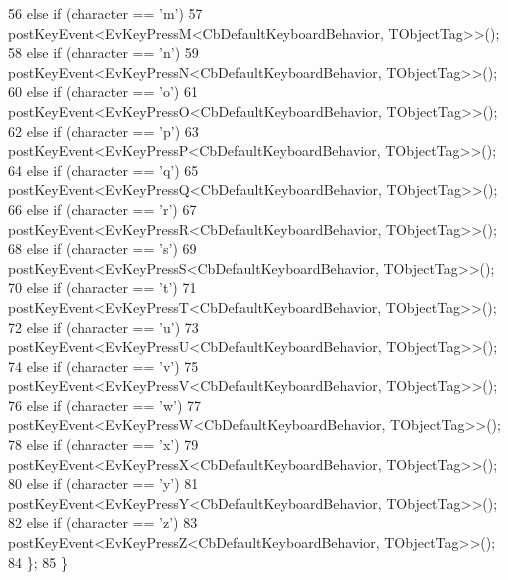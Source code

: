 \begin{DoxyCode}
56             \textcolor{keywordflow}{else} \textcolor{keywordflow}{if} (character == \textcolor{charliteral}{'m'})
57                 postKeyEvent<EvKeyPressM<CbDefaultKeyboardBehavior, TObjectTag>>();
58             \textcolor{keywordflow}{else} \textcolor{keywordflow}{if} (character == \textcolor{charliteral}{'n'})
59                 postKeyEvent<EvKeyPressN<CbDefaultKeyboardBehavior, TObjectTag>>();
60             \textcolor{keywordflow}{else} \textcolor{keywordflow}{if} (character == \textcolor{charliteral}{'o'})
61                 postKeyEvent<EvKeyPressO<CbDefaultKeyboardBehavior, TObjectTag>>();
62             \textcolor{keywordflow}{else} \textcolor{keywordflow}{if} (character == \textcolor{charliteral}{'p'})
63                 postKeyEvent<EvKeyPressP<CbDefaultKeyboardBehavior, TObjectTag>>();
64             \textcolor{keywordflow}{else} \textcolor{keywordflow}{if} (character == \textcolor{charliteral}{'q'})
65                 postKeyEvent<EvKeyPressQ<CbDefaultKeyboardBehavior, TObjectTag>>();
66             \textcolor{keywordflow}{else} \textcolor{keywordflow}{if} (character == \textcolor{charliteral}{'r'})
67                 postKeyEvent<EvKeyPressR<CbDefaultKeyboardBehavior, TObjectTag>>();
68             \textcolor{keywordflow}{else} \textcolor{keywordflow}{if} (character == \textcolor{charliteral}{'s'})
69                 postKeyEvent<EvKeyPressS<CbDefaultKeyboardBehavior, TObjectTag>>();
70             \textcolor{keywordflow}{else} \textcolor{keywordflow}{if} (character == \textcolor{charliteral}{'t'})
71                 postKeyEvent<EvKeyPressT<CbDefaultKeyboardBehavior, TObjectTag>>();
72             \textcolor{keywordflow}{else} \textcolor{keywordflow}{if} (character == \textcolor{charliteral}{'u'})
73                 postKeyEvent<EvKeyPressU<CbDefaultKeyboardBehavior, TObjectTag>>();
74             \textcolor{keywordflow}{else} \textcolor{keywordflow}{if} (character == \textcolor{charliteral}{'v'})
75                 postKeyEvent<EvKeyPressV<CbDefaultKeyboardBehavior, TObjectTag>>();
76             \textcolor{keywordflow}{else} \textcolor{keywordflow}{if} (character == \textcolor{charliteral}{'w'})
77                 postKeyEvent<EvKeyPressW<CbDefaultKeyboardBehavior, TObjectTag>>();
78             \textcolor{keywordflow}{else} \textcolor{keywordflow}{if} (character == \textcolor{charliteral}{'x'})
79                 postKeyEvent<EvKeyPressX<CbDefaultKeyboardBehavior, TObjectTag>>();
80             \textcolor{keywordflow}{else} \textcolor{keywordflow}{if} (character == \textcolor{charliteral}{'y'})
81                 postKeyEvent<EvKeyPressY<CbDefaultKeyboardBehavior, TObjectTag>>();
82             \textcolor{keywordflow}{else} \textcolor{keywordflow}{if} (character == \textcolor{charliteral}{'z'})
83                 postKeyEvent<EvKeyPressZ<CbDefaultKeyboardBehavior, TObjectTag>>();
84         \};
85     \}
\end{DoxyCode}
